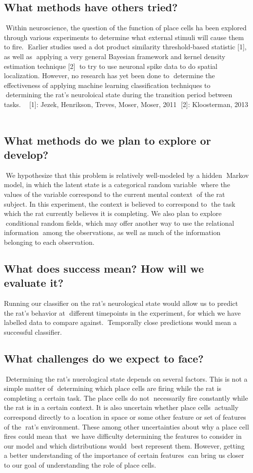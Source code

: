 \documentclass[11pt]{article}
\begin{document}
\subsection*{What methods have others tried?}
Within neuroscience, the question of the function of place cells ha been 
explored through 
various experiments to determine what external stimuli will cause them to fire. 
Earlier studies used a dot product similarity threshold-based statistic [1], as 
well as
applying a very general Bayesian framework and kernel density estimation 
technique [2]
to try to use neuronal spike data to do spatial localization. However, no 
research has yet been done to 
determine the effectiveness of applying machine learning classification 
techniques to 
determining the rat's neuroloical state during the transition period between 
tasks. 

[1]: Jezek, Henrikson, Treves, Moser, Moser, 2011
[2]: Kloosterman, 2013

\subsection*{What methods do we plan to explore or develop?}
We hypothesize that this problem is relatively well-modeled by a hidden
Markov model, in which the latent state is a categorical random variable
where the values of the variable correspond to the current mental context
of the rat subject. In this experiment, the context is believed to correspond 
to
the task which the rat currently believes it is completing. We also plan to 
explore 
conditional random fields, which may offer another way to use the relational 
information 
among the observations, as well as much of the information belonging to each 
observation.


\subsection*{What does success mean? How will we evaluate it?}
Running our classifier on the rat's neurological state would allow us to predict 
the rat's behavior at 
different timepoints in the experiment, for which we have labelled data to 
compare against.
Temporally close predictions would mean a successful classifier.

\subsection*{What challenges do we expect to face?}
Determining the rat's nuerological state depends on several factors. This is 
not a simple matter of 
determining which place cells are firing while the rat is completing a certain 
task. The place cells do not
necessarily fire constantly while the rat is in a certain context. It is also 
uncertain whether place cells 
actually correspond directly to a location in space or some other feature or 
set of features of the 
rat's environment. These among other uncertainties about why a place cell fires 
could mean that 
we have difficulty determining the features to consider in our model and which 
distributions would 
best represent them. However, getting a better understanding of the importance 
of certain features 
can bring us closer to our goal of understanding the role of place cells.
\end{document}

